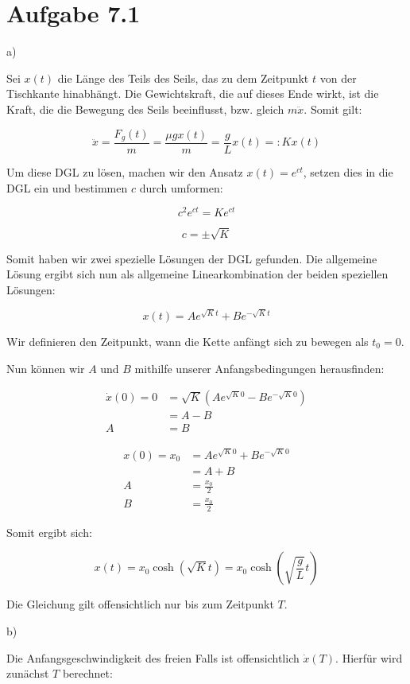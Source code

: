 \documentclass{theozettel}
\begin{document}

\section*{Aufgabe 7.1} 

a)

Sei $x(t)$ die Länge des Teils des Seils, das zu dem Zeitpunkt $t$ von der Tischkante hinabhängt. Die Gewichtskraft, die auf dieses Ende wirkt, ist die Kraft, die die Bewegung des Seils beeinflusst, bzw. gleich $m \ddot{x}$. Somit gilt:

$$
\ddot{x} = \frac{F_g(t)}{m} = \frac{\mu g x(t)}{m} = \frac{g}{L} x(t) =: K x(t)
$$

Um diese DGL zu lösen, machen wir den Ansatz $x(t) = e^{ct}$, setzen dies in die DGL ein und bestimmen $c$ durch umformen:

$$
c^{2} e^{ct} = K e^{ct}
$$

$$
c = \pm \sqrt{K}
$$

Somit haben wir zwei spezielle Lösungen der DGL gefunden. Die allgemeine Lösung ergibt sich nun als allgemeine Linearkombination der beiden speziellen Lösungen:

$$
x(t) = A e^{\sqrt{K} t} + B e^{- \sqrt{K} t}
$$

Wir definieren den Zeitpunkt, wann die Kette anfängt sich zu bewegen als $t_0 = 0$.

Nun können wir $A$ und $B$ mithilfe unserer Anfangsbedingungen herausfinden:

\begin{align*}
\dot{x}(0) = 0 &= \sqrt{K} (A e^{\sqrt{K} 0} - B e^{- \sqrt{K} 0}) \\
&= A - B \\
A &= B
\end{align*}


\begin{align*}
x(0) = x_0 &= A e^{\sqrt{K} 0} + B e^{- \sqrt{K} 0} \\
&= A + B \\
A &= \frac{x_0}{2} \\
B &= \frac{x_0}{2}
\end{align*}

Somit ergibt sich:

$$
x(t) = x_0 \cosh(\sqrt{K} t) = x_0 \cosh(\sqrt{\frac{g}{L}} t)
$$

Die Gleichung gilt offensichtlich nur bis zum Zeitpunkt $T$.


b)

Die Anfangsgeschwindigkeit des freien Falls ist offensichtlich $\dot{x}(T)$. Hierfür wird zunächst $T$ berechnet:
\end{document}
